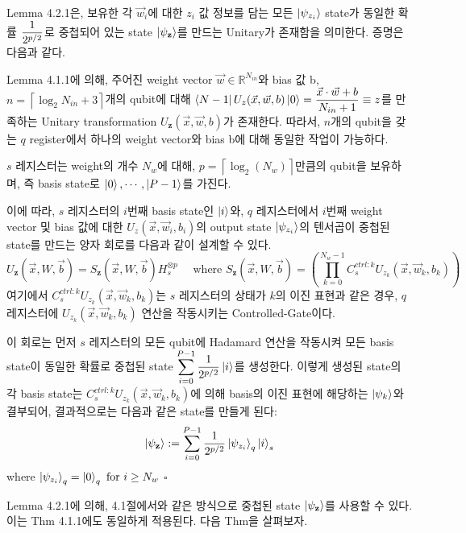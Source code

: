 Lemma 4.2.1은, 보유한 각 \(\vec{w}_i\)에 대한 \(\displaystyle {z}_i\) 값 정보를 담는 모든 \(\ket{\psi_{z_i}}\) state가 동일한 확률 \(\displaystyle {1 \over {2^{p/2}}}\)로 중첩되어 있는 state \(\ket{\psi_{\mathbf z}}\)를 만드는 Unitary가 존재함을 의미한다. 증명은 다음과 같다.

\begin{pf} 
    Lemma 4.1.1에 의해, 주어진 weight vector $\vec{w} \in \mathbb{R}^{N_{in}}$와 bias 값 b, \(n = \left\lceil \log_2{N_{in}} + 3 \right\rceil\)개의 qubit에 대해 \(\displaystyle \bra{N-1}U_z(\vec{x},\vec{w},b)\ket{0} = \frac{\vec{x}\cdot \vec{w}+b}{N_{in}+1} \equiv z\)를 만족하는 Unitary transformation \(U_{\mathbf z}(\vec{x},\vec{w},b)\)가 존재한다. 따라서, $n$개의 qubit을 갖는 $q$ register에서 하나의 weight vector와 bias b에 대해 동일한 작업이 가능하다.

    $s$ 레지스터는 weight의 개수 \(N_w\)에 대해, \(p = \left\lceil \log_2(N_w) \right\rceil\)만큼의 qubit을 보유하며, 즉 basis state로 \(\ket{0}, \cdots, \ket{P-1}\)를 가진다.

    이에 따라, \(s\) 레지스터의 \(i\)번째 basis state인 \(\ket{i}\)와, \(q\) 레지스터에서 \(i\)번째 weight vector 및 bias 값에 대한 \(U_z(\vec{x}, \vec{w}_i, b_i)\)의 output state \(\ket{\psi_{z_i}}\)의 텐서곱이 중첩된 state를 만드는 양자 회로를 다음과 같이 설계할 수 있다.
    \[
        U_{\mathbf z}(\vec{x}, W, \vec{b}) = S_{\mathbf z}(\vec{x}, W, \vec{b}) H_s^{\otimes p} \quad \text{ where } S_{\mathbf z}(\vec{x}, W, \vec{b})= \left(\prod_{k=0}^{N_w-1}C_{s}^{ctrl : k}U_{z_k}(\vec{x}, \vec{w}_k, b_k)\right)
    \]
    여기에서 \(C_{s}^{ctrl:k}U_{z_k}(\vec{x}, \vec{w}_k, b_k)\)는 \(s\) 레지스터의 상태가 \(k\)의 이진 표현과 같은 경우, \(q\) 레지스터에 \(U_{z_k}(\vec{x}, \vec{w}_k, b_k)\) 연산을 작동시키는 Controlled-Gate이다.

    이 회로는 먼저 \(s\) 레지스터의 모든 qubit에 Hadamard 연산을 작동시켜 모든 basis state이 동일한 확률로 중첩된 state \(\displaystyle \sum_{i=0}^{P-1} {1\over {2^{p/2}}}\ket{i}\)를 생성한다. 이렇게 생성된 state의 각 basis state는 \(C_{s}^{ctrl:k}U_{z_k}(\vec{x}, \vec{w}_k, b_k)\)에 의해 basis의 이진 표현에 해당하는 $\ket{\psi_k}$와 결부되어, 결과적으로는 다음과 같은 state를 만들게 된다:
    \[
        \ket{\psi_{\mathbf{z}}} := \sum_{i=0}^{P-1} {1\over {2^{p/2}}} \ket{\psi_{z_i}}_q \ket{i}_s 
    \]
    where \(\ket{\psi_{z_i}}_q = \ket{0}_q \text{ for } i \ge N_w\) \quad $\square$
\end{pf}

Lemma 4.2.1에 의해, 4.1절에서와 같은 방식으로 중첩된 state \(\ket{\psi_{\mathbf z}}\)를 사용할 수 있다. 이는 Thm 4.1.1에도 동일하게 적용된다. 다음 Thm을 살펴보자.

